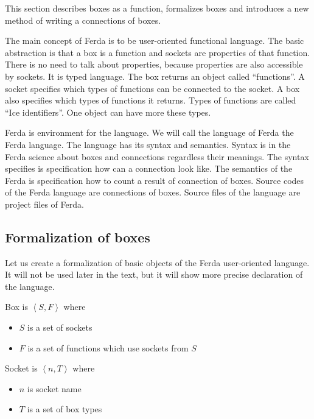 \documentclass[a4paper,12pt]{book}
\begin{document}
This section describes boxes as a function, formalizes boxes and introduces a new method of writing a connections of boxes.

The main concept of Ferda is to be user-oriented functional language. The basic abstraction is that a box is a function and sockets are properties of that function. There is no need to talk about properties, because properties are also accessible by sockets. It is typed language. The box returns an object called ``functions''. A socket specifies which types of functions can be connected to the socket. A box also specifies which types of functions it returns. Types of functions are called ``Ice identifiers''. One object can have more these types.

Ferda is environment for the language. We will call the language of Ferda the Ferda language. The language has its syntax and semantics. Syntax is in the Ferda science about boxes and connections regardless their meanings. The syntax specifies is specification how can a connection look like. The semantics of the Ferda is specification how to count a result of connection of boxes. Source codes of the Ferda language are connections of boxes. Source files of the language are project files of Ferda.

\subsection{Formalization of boxes}
Let us create a formalization of basic objects of the Ferda user-oriented language. It will not be used later in the text, but it will show more precise declaration of the language.


\begin{mydef}
Box is $\left<S,F\right>$ where
\begin{itemize}
	\item $S$ is a set of sockets
	\item $F$ is a set of functions which use sockets from $S$
\end{itemize}
\end{mydef}

\begin{mydef}
Socket is $\left<n,T\right>$ where
\begin{itemize}
	\item $n$ is socket name
	\item $T$ is a set of box types
\end{itemize}
\end{mydef}
\end{document}
